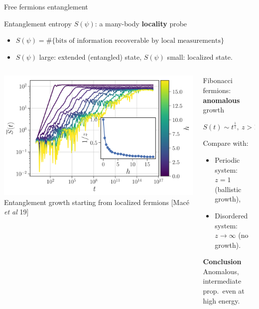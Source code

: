 \begin{frame}{Free fermions entanglement}
\begin{block}{Entanglement entropy $S(\psi)$: a many-body \textbf{locality} probe}
\begin{itemize}
	\item $S(\psi) = \#\{\text{bits of information recoverable by local measurements}\}$
	\item $S(\psi)$ large: extended (entangled) state, $S(\psi)$ small: localized state.
\end{itemize}
\end{block}
\begin{columns}
\begin{column}{0.4\textwidth}
\centering
\includegraphics[width=\textwidth]{img/3_Fibonacci/free_fermions_entanglement_inset_coefficients}
{\footnotesize Entanglement growth starting from localized fermions [Macé \emph{et al} 19]}
\end{column}
\begin{column}{0.6\textwidth}
Fibonacci fermions: \textbf{anomalous} growth

$S(t) \sim t^{\frac{1}{z}},~z > 1$

Compare with:
\begin{itemize}
	\item Periodic system: $z=1$ (ballistic growth),
	\item Disordered system: $z \to \infty$ (no growth).
\end{itemize}
\begin{block}{\textbf{Conclusion}}
Anomalous, intermediate prop.\, even at high energy.
\end{block}
\end{column}
\end{columns}
\end{frame}

